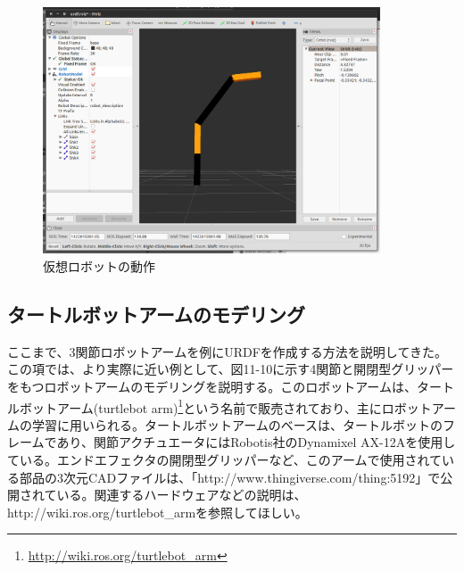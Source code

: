 \begin{figure}[htp]
  \centering
  \includegraphics[width=10cm]{pictures/chapter11/pic_11_09.png}
  \caption{仮想ロボットの動作}
\end{figure}

\subsection{タートルボットアームのモデリング}

ここまで、3関節ロボットアームを例にURDFを作成する方法を説明してきた。この項では、より実際に近い例として、図11-10に示す4関節と開閉型グリッパーをもつロボットアームのモデリングを説明する。このロボットアームは、タートルボットアーム(turtlebot arm)\footnote{\url{http://wiki.ros.org/turtlebot_arm}}という名前で販売されており、主にロボットアームの学習に用いられる。タートルボットアームのベースは、タートルボットのフレームであり、関節アクチュエータにはRobotis社のDynamixel AX-12Aを使用している。エンドエフェクタの開閉型グリッパーなど、このアームで使用されている部品の3次元CADファイルは、「http://www.thingiverse.com/thing:5192」で公開されている。関連するハードウェアなどの説明は、http://wiki.ros.org/turtlebot\_armを参照してほしい。

